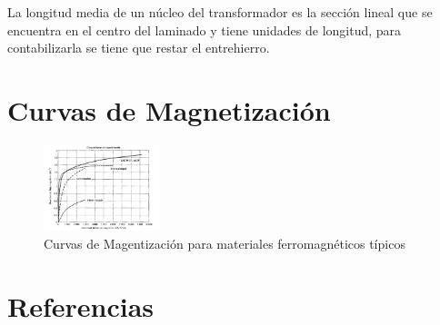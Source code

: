\documentclass[]{article}
\begin{document}
La longitud media de un núcleo del transformador es la sección lineal que se encuentra en el centro del laminado y tiene unidades de longitud, para contabilizarla se tiene que restar el entrehierro.\\


\section{Curvas de Magnetización}

\begin{figure}[h!]
	\centering
	\includegraphics[width=0.3\textwidth]{curvasMagnetizacion}
	\caption{Curvas de Magentización para materiales ferromagnéticos típicos}
	\label{curvasMag}
\end{figure}




\section{Referencias}

%
%



\begin{thebibliography}{9}
	
	
	
	
	
\end{thebibliography}
\end{document}

